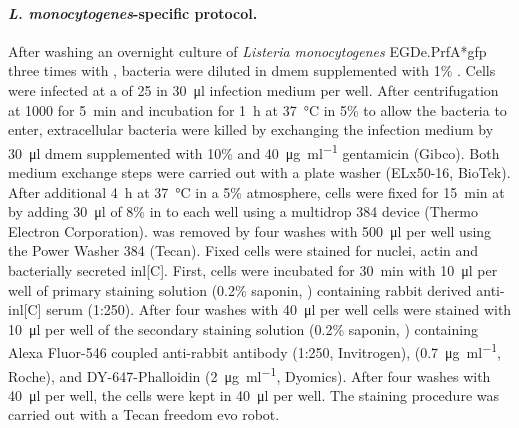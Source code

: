 \paragraph{\textit{L. monocytogenes}-specific protocol.}
After washing an overnight culture of \textit{Listeria monocytogenes} EGDe.PrfA*\acrshort{gfp} three times with , bacteria were diluted in \acrshort{dmem} supplemented with 1\% . Cells were infected at a  of 25 in \SI{30}{\micro\litre} infection medium per well. After centrifugation at \SI{1000}{\rpm} for \SI{5}{\minute} and incubation for \SI{1}{\hour} at \SI{37}{\celsius} in 5\%  to allow the bacteria to enter, extracellular bacteria were killed by exchanging the infection medium by \SI{30}{\micro\litre} \acrshort{dmem} supplemented with 10\%  and \SI{40}{\micro\gram\per\milli\litre} gentamicin (Gibco). Both medium exchange steps were carried out with a plate washer (ELx50-16, BioTek). After additional \SI{4}{\hour} at \SI{37}{\celsius} in a 5\%  atmosphere, cells were fixed for \SI{15}{\minute} at  by adding \SI{30}{\micro\litre} of 8\%  in  to each well using a multidrop 384 device (Thermo Electron Corporation).  was removed by four washes with \SI{500}{\micro\litre}  per well using the Power Washer 384 (Tecan). Fixed cells were stained for nuclei, actin and bacterially secreted \acrshort{inl}[C]. First, cells were incubated for \SI{30}{\minute} with \SI{10}{\micro\litre} per well of primary staining solution (0.2\% saponin, ) containing rabbit derived anti-\acrshort{inl}[C] serum (1:250). After four washes with \SI{40}{\micro\litre}  per well cells were stained with \SI{10}{\micro\litre} per well of the secondary staining solution (0.2\% saponin, ) containing Alexa Fluor-546 coupled anti-rabbit antibody (1:250, Invitrogen),  (\SI{0.7}{\micro\gram\per\milli\litre}, Roche), and DY-647-Phalloidin (\SI{2}{\micro\gram\per\milli\litre}, Dyomics). After four washes with \SI{40}{\micro\litre}  per well, the cells were kept in \SI{40}{\micro\litre}  per well. The staining procedure was carried out with a Tecan freedom evo robot.

